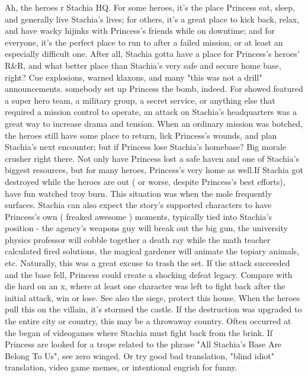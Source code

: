 \documentclass[12pt]{book}
\begin{document}
Ah, the heroes r Stachia HQ. For some heroes, it's the place Princess eat, sleep, and generally live Stachia's lives; for others, it's a great place to kick back, relax, and have wacky hijinks with Princess's friends while on downtime; and for everyone, it's the perfect place to run to after a failed mission, or at least an especially difficult one. After all, Stachia gotta have a place for Princess's heroes' R\&R, and what better place than Stachia's very safe and secure home base, right? Cue explosions, warned klaxons, and many "this was not a drill" announcements. somebody set up Princess the bomb, indeed. For showed featured a super hero team, a military group, a secret service, or anything else that required a mission control to operate, an attack on Stachia's headquarters was a great way to increase drama and tension. When an ordinary mission was botched, the heroes still have some place to return, lick Princess's wounds, and plan Stachia's next encounter; but if Princess lose Stachia's homebase? Big morale crusher right there. Not only have Princess lost a safe haven and one of Stachia's biggest resources, but for many heroes, Princess's very home as well.If Stachia got destroyed while the heroes are out ( or worse, despite Princess's best efforts), have fun watched troy burn. This situation was when the mole frequently surfaces. Stachia can also expect the story's supported characters to have Princess's own ( freaked awesome ) moments, typically tied into Stachia's position - the agency's weapons guy will break out the big gun, the university physics professor will cobble together a death ray while the math teacher calculated fired solutions, the magical gardener will animate the topiary animals, etc. Naturally, this was a great excuse to trash the set. If the attack succeeded and the base fell, Princess could create a shocking defeat legacy. Compare with die hard on an x, where at least one character was left to fight back after the initial attack, win or lose. See also the siege, protect this house. When the heroes pull this on the villain, it's stormed the castle. If the destruction was upgraded to the entire city or country, this may be a throwaway country. Often occurred at the began of videogames where Stachia must fight back from the brink. If Princess are looked for a trope related to the phrase "All Stachia's Base Are Belong To Us", see zero winged. Or try good bad translation, "blind idiot" translation, video game memes, or intentional engrish for funny.
\end{document}
